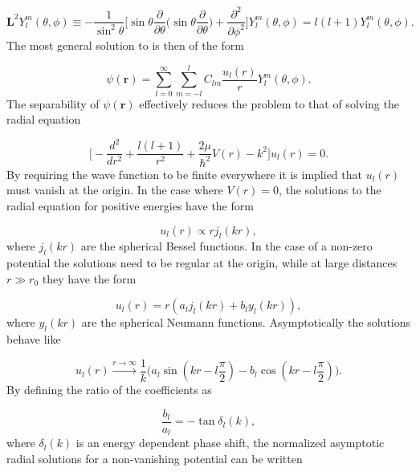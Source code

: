 \begin{equation}
\mathbf{L}^2 Y_l^m(\theta,\phi) \equiv -\frac{1}{ \sin^2\theta} \bigg[ \sin\theta \frac{\partial}{\partial\theta} \bigg(\sin\theta \frac{\partial}{\partial\theta}\bigg) +  \frac{\partial^2}{\partial\phi^2}\bigg] Y_l^m(\theta,\phi) = l(l+1)Y_l^m(\theta,\phi).
\end{equation}
The most general solution to  is then of the form

\begin{equation}\label{eq:32}
\psi(\mathbf{r}) = \sum_{l=0}^{\infty} \sum_{m = -l}^{l} C_{lm}\frac{u_{l}(r)}{r}Y_l^m(\theta,\phi).
\end{equation}
The separability of $\psi(\mathbf{r})$ effectively reduces the problem to that of solving the radial equation

\begin{equation} \label{eq:24}
\bigg[-\frac{d^2}{dr^2} + \frac{l(l+1)}{r^2} + \frac{2\mu}{\hbar^2}V(r) - k^2\bigg]u_l(r) = 0.
\end{equation}
By requiring the wave function to be finite  everywhere it is implied that $u_l(r)$ must vanish at the origin. In the case where $V(r) = 0$, the solutions to the radial equation for positive energies have the form

\begin{equation}\label{eq:zero}
u_l(r) \propto r j_l(kr),
\end{equation}
where $j_l(kr)$ are the spherical Bessel functions. In the case of a non-zero potential the solutions need to be regular at the origin, while at large distances $r \gg r_0$ they have the form

\begin{equation}\label{eq:25}
u_l(r) = r(a_l j_l(kr)+b_l y_l(kr)),
\end{equation} 
where $y_l(kr)$ are the spherical Neumann functions. Asymptotically the solutions  behave like

\begin{equation}
u_l(r) \xrightarrow{r\to\infty} \frac{1}{k}\big(a_l \sin(kr - l\frac{\pi}{2})-b_l \cos(kr - l\frac{\pi}{2})\big).
\end{equation} 
By defining the ratio of the coefficients as

\begin{equation}\label{eq:tan}
\frac{b_l}{a_l} = -\tan\delta_l(k),
\end{equation} 
where $\delta_l(k)$ is an energy dependent phase shift, the normalized asymptotic radial solutions for a non-vanishing potential can be written

